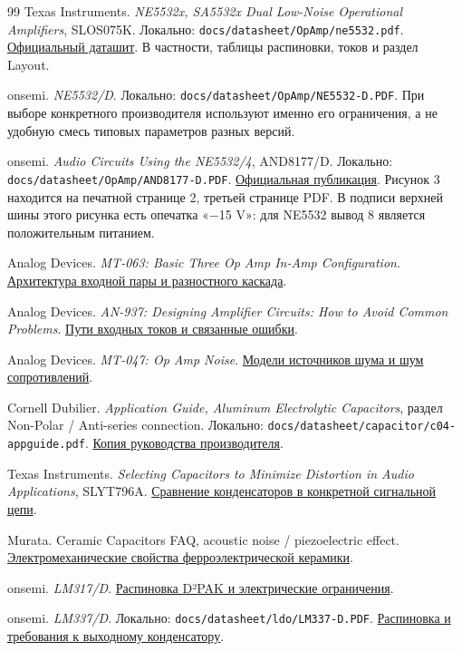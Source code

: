 \documentclass[a4paper,11pt]{article}
\newcommand{\file}[1]{\nolinkurl{#1}}
\begin{document}
\clearpage
{}
{}
\begin{thebibliography}{99}
Texas Instruments. \emph{NE5532x, SA5532x Dual Low-Noise Operational Amplifiers},
SLOS075K. Локально: \file{docs/datasheet/OpAmp/ne5532.pdf}.
\href{https://www.ti.com/lit/ds/symlink/ne5532.pdf}{Официальный даташит}.
В частности, таблицы распиновки, токов и раздел Layout.

onsemi. \emph{NE5532/D}. Локально:
\file{docs/datasheet/OpAmp/NE5532-D.PDF}.
При выборе конкретного производителя используют именно его ограничения,
а не удобную смесь типовых параметров разных версий.

onsemi. \emph{Audio Circuits Using the NE5532/4}, AND8177/D.
Локально: \file{docs/datasheet/OpAmp/AND8177-D.PDF}.
\href{https://www.onsemi.com/download/application-notes/pdf/and8177-d.pdf}{Официальная публикация}.
Рисунок 3 находится на печатной странице 2, третьей странице PDF.
В подписи верхней шины этого рисунка есть опечатка «−15 V»:
для NE5532 вывод 8 является положительным питанием.

Analog Devices. \emph{MT-063: Basic Three Op Amp In-Amp Configuration}.
\href{https://www.analog.com/media/en/training-seminars/tutorials/MT-063.pdf}{Архитектура входной пары и разностного каскада}.

Analog Devices. \emph{AN-937: Designing Amplifier Circuits: How to Avoid Common Problems}.
\href{https://www.analog.com/en/resources/app-notes/an-937.html}{Пути входных токов и связанные ошибки}.

Analog Devices. \emph{MT-047: Op Amp Noise}.
\href{https://www.analog.com/media/en/training-seminars/tutorials/MT-047.pdf}{Модели источников шума и шум сопротивлений}.

Cornell Dubilier. \emph{Application Guide, Aluminum Electrolytic Capacitors},
раздел Non-Polar / Anti-series connection.
Локально: \file{docs/datasheet/capacitor/c04-appguide.pdf}.
\href{https://knowledge.electrochem.org/encycl/c04-appguide.pdf}{Копия руководства производителя}.

Texas Instruments. \emph{Selecting Capacitors to Minimize Distortion in Audio Applications},
SLYT796A. \href{https://www.ti.com/lit/an/slyt796a/slyt796a.pdf}{Сравнение конденсаторов в конкретной сигнальной цепи}.

Murata. Ceramic Capacitors FAQ, acoustic noise / piezoelectric effect.
\href{https://www.murata.com/support/faqs/capacitor/ceramiccapacitor/char/0020}{Электромеханические свойства ферроэлектрической керамики}.

onsemi. \emph{LM317/D}.
\href{https://www.onsemi.com/pdf/datasheet/lm317-d.pdf}{Распиновка D²PAK и электрические ограничения}.

onsemi. \emph{LM337/D}. Локально:
\file{docs/datasheet/ldo/LM337-D.PDF}.
\href{https://www.onsemi.com/pdf/datasheet/lm337-d.pdf}{Распиновка и требования к выходному конденсатору}.
\end{thebibliography}
\end{document}

